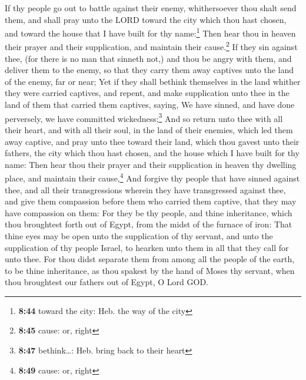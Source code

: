  If thy people go out to battle against their enemy,
whithersoever thou shalt send them, and shall pray unto the LORD toward
the city which thou hast chosen, and toward the house that I have built
for thy name:\footnote{\textbf{8:44} toward the city: Heb. the way of
  the city}  Then hear thou in heaven their prayer and
their supplication, and maintain their cause.\footnote{\textbf{8:45}
  cause: or, right}  If they sin against thee, (for there
is no man that sinneth not,) and thou be angry with them, and deliver
them to the enemy, so that they carry them away captives unto the land
of the enemy, far or near;  Yet if they shall bethink
themselves in the land whither they were carried captives, and repent,
and make supplication unto thee in the land of them that carried them
captives, saying, We have sinned, and have done perversely, we have
committed wickedness;\footnote{\textbf{8:47} bethink\ldots: Heb. bring
  back to their heart}  And so return unto thee with all
their heart, and with all their soul, in the land of their enemies,
which led them away captive, and pray unto thee toward their land, which
thou gavest unto their fathers, the city which thou hast chosen, and the
house which I have built for thy name:  Then hear thou
their prayer and their supplication in heaven thy dwelling place, and
maintain their cause,\footnote{\textbf{8:49} cause: or, right}
 And forgive thy people that have sinned against thee,
and all their transgressions wherein they have transgressed against
thee, and give them compassion before them who carried them captive,
that they may have compassion on them:  For they be thy
people, and thine inheritance, which thou broughtest forth out of Egypt,
from the midst of the furnace of iron:  That thine eyes
may be open unto the supplication of thy servant, and unto the
supplication of thy people Israel, to hearken unto them in all that they
call for unto thee.  For thou didst separate them from
among all the people of the earth, to be thine inheritance, as thou
spakest by the hand of Moses thy servant, when thou broughtest our
fathers out of Egypt, O Lord GOD.

